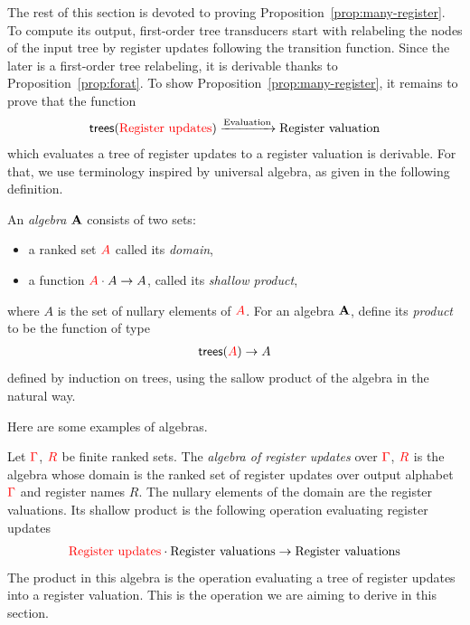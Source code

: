 The rest of this section is devoted to proving Proposition~\ref{prop:many-register}. To compute its output, first-order tree transducers start with relabeling the nodes of the input tree by register updates following the transition function. Since the later is a first-order tree relabeling, it is derivable thanks to Proposition~\ref{prop:forat}. To show Proposition~\ref{prop:many-register}, it remains to prove that the function
\begin{align*}
\mathsf {trees}({\color{red}{\text{Register updates}}}) \xrightarrow{\text{Evaluation}} \text{Register valuation} 
\end{align*}
which evaluates a tree of register updates to a register valuation is derivable. For that, we use  terminology inspired by universal algebra, as given in the following definition. 
\begin{definition}
    An \emph{algebra} ${\color{black}\mathbf A}$ consists of two sets: 
 \begin{itemize}
 \item a ranked set ${\color{red}{A}}$ called its \emph{domain},
\item  a function ${\color{red}{A}}\cdot A \to A$, called its \emph{shallow product}, 
 \end{itemize}
 where $A$ is the set of nullary elements of ${\color{red}{A}}$. 
    For an algebra ${\color{black}\mathbf A}$, define its \emph{product} to be the function of type
    \begin{align*}
\mathsf {trees}( {\color{red}{A}} ) \to A
    \end{align*}
    defined by induction on trees, using the sallow product of the algebra in the natural way.
\end{definition}
Here are some examples of algebras.
\begin{example} Let ${\color{red}{\Gamma}}$, ${\color{red}{R}}$ be finite ranked
sets. The \emph{algebra of register updates} over ${\color{red}{\Gamma}}$, ${\color{red}{R}}$ is the algebra whose  domain is the ranked set of register updates over output alphabet ${\color{red}{\Gamma}}$ and register names $R$. The nullary elements of the domain are the register valuations.  Its shallow product is the following operation evaluating register updates 
    \begin{align*}
 {{\color{red}{\text{Register updates}}}} \cdot {\text{Register valuations}}  \to \text{Register valuations}
    \end{align*}
The product in this algebra is the operation evaluating a tree of register updates into a register valuation. This  is the operation we are aiming to derive in this section.
\end{example}

